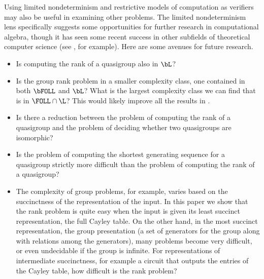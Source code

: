 Using limited nondeterminism and restrictive models of computation as verifiers may also be useful in examining other problems.
The limited nondeterminism lens specifically suggests some opportunities for further research in computational algebra, though it has seen some recent success in other subfields of theoretical computer science (see \autocite{gottlob13}, for example).
Here are some avenues for future research.
\begin{itemize}
\item Is computing the rank of a quasigroup also in $\bL$?
\item
  Is the group rank problem in a smaller complexity class, one contained in both $\bFOLL$ and $\bL$?
  What is the largest complexity class we can find that is in $\FOLL \cap \L$?
  This would likely improve all the results in \autocite{bklm01}.
\item Is there a reduction between the problem of computing the rank of a quasigroup and the problem of deciding whether two quasigroups are isomorphic?
\item Is the problem of computing the shortest generating sequence for a quasigroup strictly more difficult than the problem of computing the rank of a quasigroup?
\item
  The complexity of group problems, for example, varies based on the succinctness of the representation of the input.
  In this paper we show that the rank problem is quite easy when the input is given its least succinct representation, the full Cayley table.
  On the other hand, in the most succinct representation, the group presentation (a set of generators for the group along with relations among the generators), many problems become very difficult, or even undecidable if the group is infinite.
  For representations of intermediate succinctness, for example a circuit that outputs the entries of the Cayley table, how difficult is the rank problem?
\end{itemize}
